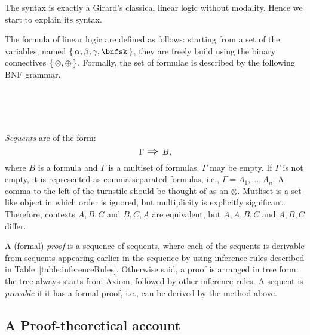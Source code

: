 The syntax  is exactly a  Girard's classical linear logic without modality. 
Hence we start to explain its syntax. 
\begin{definition} [formula]
The formula of linear logic are defined as follows:  
starting from a set of the variables, named $ \set{\alpha,\beta,\gamma,\bnfsk}$, 
they are freely build using the binary connectives $\set{\otimes,\oplus}$.
Formally, the set of formulae is described by the following BNF grammar.
%
\begin{bnf*}
   \\
 \\
   \\
\end{bnf*}
\end{definition}

\begin{definition} [sequent] 
 {\it Sequents}  are of the form:
%
\[  \Gamma \mbox{ \Large$\Rightarrow$ } B \mbox{,} \]
%
where $B$ is a formula and  $\Gamma$  is a multiset of formulas.
$\Gamma$ may be empty.
If $\Gamma$ is not empty, it is represented  as comma-separated formulas, 
i.e., $\Gamma = A_1, \ldots , A_n$. 
A comma to the left of the turnstile should be thought of as an $\otimes$.
%
Mutliset is a set-like object in which order is ignored, but multiplicity is explicitly significant. 
Therefore, contexts $A,B,C$ and $B,C,A$ are equivalent, 
but $A,A,B,C$ and $A,B,C$ differ.
\end{definition}

\begin{definition} [proof]
A (formal) {\it proof} is a sequence of sequents,
where each of the sequents is derivable from sequents appearing earlier in the sequence
 by using inference rules described in Table~\ref{table:inferenceRules}. 
Otherwise said, a proof is arranged in tree form: 
the tree always starts from Axiom, followed by other inference rules. 
%
A sequent is {\it provable} if it has a formal proof, i.e., can be derived by the method above. 
\end{definition}

\subsection{A Proof-theoretical account }

